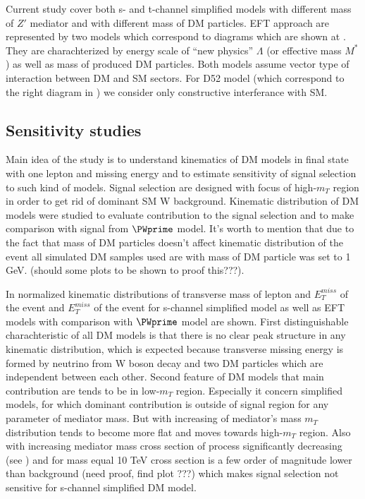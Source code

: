 Current study cover both s- and t-channel simplified models with different mass of $Z'$ mediator and with different mass of DM particles.
EFT approach are represented by two models which correspond to diagrams which are shown at . 
They are charachterized by energy scale of ``new physics'' $\Lambda$ (or effective mass $M^{*}$) as well as mass of produced DM particles.
Both models assume vector type of interaction between DM and SM sectors. For D52 model (which correspond to the right diagram in  ) 
we consider only constructive interferance with SM.

\subsection{Sensitivity studies}

Main idea of the study is to understand kinematics of DM models in final state with one lepton and missing energy and to estimate sensitivity 
of signal selection to such kind of models.
Signal selection are designed with focus of high-$m_{T}$ region in order to get rid of dominant SM W background.
Kinematic distribution of DM models were studied to evaluate contribution to the signal selection and to make comparison
with signal from $\PWprime$ model.
It's worth to mention that due to the fact that mass of DM particles doesn't affect kinematic distribution of the event 
all simulated DM samples used are with mass of DM particle was set to 1 GeV.
(should some plots to be shown to proof this???).

In  normalized kinematic distributions of transverse mass of lepton and $E_{T}^{miss}$ of the event
and $E_{T}^{miss}$ of the event for s-channel simplified model as well as EFT models with comparison with $\PWprime$ model are shown.
First distinguishable charachteristic of all DM models is that there is no clear peak structure in any kinematic distribution, 
which is expected because transverse missing energy is formed by
neutrino from W boson decay and two DM particles which are independent between each other. 
Second feature of DM models that main contribution are tends to be in low-$m_{T}$ region.
Especially it concern simplified models, for which dominant contribution is outside of signal region for any parameter of mediator mass.
But with increasing of mediator's mass $m_{T}$ distribution tends to become more flat and moves towards high-$m_{T}$ region.
Also with increasing mediator mass cross section of process significantly decreasing (see ) 
and for mass equal 10 TeV cross section is a few order of magnitude lower than background (need proof, find plot ???) which 
makes signal selection not sensitive for s-channel simplified DM model.

